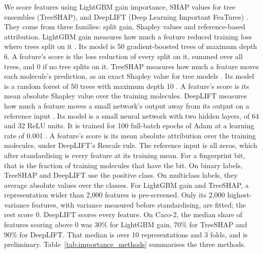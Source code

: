 We score features using LightGBM gain importance, SHAP values for tree ensembles (TreeSHAP), and DeepLIFT (Deep Learning Important FeaTures) \citep{Shrikumar2017}. They come from three families: split gain, Shapley values and reference-based attribution. LightGBM gain measures how much a feature reduced training loss where trees split on it \citep{ke2017lightgbm}. Its model is 50 gradient-boosted trees of maximum depth 6. A feature's score is the loss reduction of every split on it, summed over all trees, and 0 if no tree splits on it. TreeSHAP measures how much a feature moves each molecule's prediction, as an exact Shapley value for tree models \citep{Lundberg2020}. Its model is a random forest of 50 trees with maximum depth 10 \citep{Breiman2001}. A feature's score is its mean absolute Shapley value over the training molecules. DeepLIFT measures how much a feature moves a small network's output away from its output on a reference input \citep{Shrikumar2017, Kokhlikyan2020}. Its model is a small neural network with two hidden layers, of 64 and 32 ReLU units. It is trained for 100 full-batch epochs of Adam at a learning rate of 0.001 \citep{Kingma2015}. A feature's score is its mean absolute attribution over the training molecules, under DeepLIFT's Rescale rule. The reference input is all zeros, which after standardising is every feature at its training mean. For a fingerprint bit, that is the fraction of training molecules that have the bit. On binary labels, TreeSHAP and DeepLIFT use the positive class. On multiclass labels, they average absolute values over the classes. For LightGBM gain and TreeSHAP, a representation wider than 2,000 features is pre-screened. Only its 2,000 highest-variance features, with variance measured before standardising, are fitted; the rest score 0. DeepLIFT scores every feature. On Caco-2, the median share of features scoring above 0 was 30\% for LightGBM gain, 70\% for TreeSHAP and 90\% for DeepLIFT. That median is over 10 representations and 3 folds, and is preliminary. Table~\ref{tab:importance_methods} summarises the three methods.

